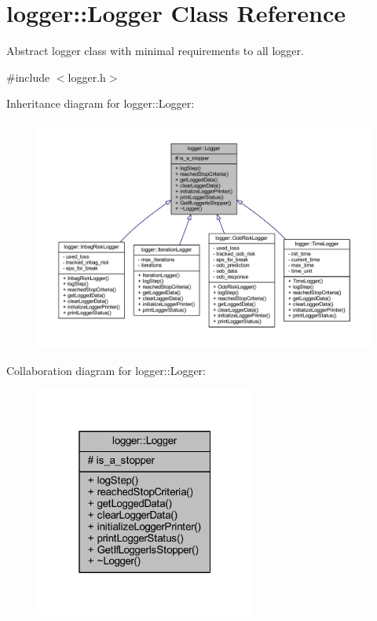 \hypertarget{classlogger_1_1_logger}{}\section{logger\+:\+:Logger Class Reference}
\label{classlogger_1_1_logger}


Abstract logger class with minimal requirements to all logger.  




{\ttfamily \#include $<$logger.\+h$>$}



Inheritance diagram for logger\+:\+:Logger\+:\nopagebreak
\begin{figure}[H]
\begin{center}
\leavevmode
\includegraphics[width=350pt]{classlogger_1_1_logger__inherit__graph}
\end{center}
\end{figure}


Collaboration diagram for logger\+:\+:Logger\+:\nopagebreak
\begin{figure}[H]
\begin{center}
\leavevmode
\includegraphics[width=205pt]{classlogger_1_1_logger__coll__graph}
\end{center}
\end{figure}
